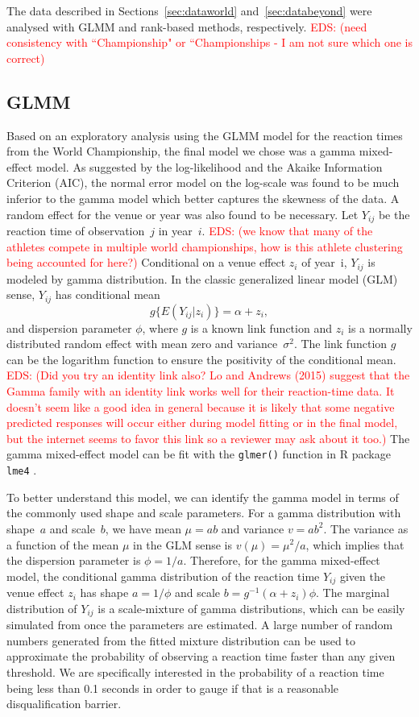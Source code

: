 \documentclass[12pt, letterpaper, titlepage]{article}
\newcommand{\eds}[1]{\textcolor{red}{EDS: (#1)}}
\begin{document}
The %
data described in Sections~\ref{sec:dataworld} and~\ref{sec:databeyond} were
analysed with GLMM and rank-based methods, respectively.
\eds{need consistency with ``Championship" or ``Championships - I am not sure 
which one is correct}

\subsection{GLMM}
Based on an exploratory analysis using the GLMM model for the reaction times
from the World Championship, the final model we chose was a gamma mixed-effect 
model. As suggested by the log-likelihood and the Akaike Information
Criterion (AIC), the normal error model on the log-scale was found to be
much inferior to the gamma model which better captures the skewness of the
data. A random effect for the venue or year was also found to be necessary.
Let $Y_{ij}$ be the reaction time of observation~$j$ in year~$i$.
\eds{we know that many of the athletes compete in multiple world championships,
how is this athlete clustering being accounted for here?}
Conditional on a venue effect $z_i$ of year~i,  $Y_{ij}$ is modeled by 
gamma distribution. In the classic generalized linear model (GLM) sense,
$Y_{ij}$ has conditional mean
\[
g\{E(Y_{ij} | z_i)\} = \alpha + z_i,
\]
and dispersion parameter $\phi$, where $g$ is a known link function and
$z_i$ is a normally distributed random effect with mean zero and
variance~$\sigma^2$. The link function $g$ can be the logarithm function to
ensure the positivity of the conditional mean.
\eds{Did you try an identity link also? Lo and Andrews (2015) suggest that the 
Gamma family with an identity link works well for their reaction-time data.
It doesn't seem like a good idea in general because it is likely that some 
negative predicted responses will occur either during model fitting or in the 
final model, but the internet seems to favor this link so a reviewer may ask 
about it too.}
The gamma mixed-effect model can be fit with the \texttt{glmer()} function in R
package \texttt{lme4} \citep{lme4}.


To better understand this model, we can identify the gamma model in terms of the
commonly used shape and scale parameters. For a gamma distribution with
shape~$a$ and scale~$b$, we have mean $\mu = ab$ and variance $v = ab^2$. The
variance as a function of the mean $\mu$ in the GLM sense is
$v(\mu) = \mu^2 / a$, which implies that the dispersion parameter is
$\phi = 1 / a$. Therefore, for the gamma mixed-effect model, the conditional
gamma distribution of the reaction time $Y_{ij}$ given the venue effect $z_i$
has shape $a = 1 / \phi$ and scale $b = g^{-1}(\alpha + z_i) \phi$. The marginal
distribution of $Y_{ij}$ is a scale-mixture of gamma distributions, which can be
easily simulated from once the parameters are estimated. A large number of
random numbers generated from the fitted mixture distribution can be used to
approximate the probability of observing a reaction time faster than any given
threshold.  We are specifically interested in the probability of a reaction time
 being less than 0.1 seconds in order to gauge if that is a reasonable 
disqualification barrier.
\end{document}
